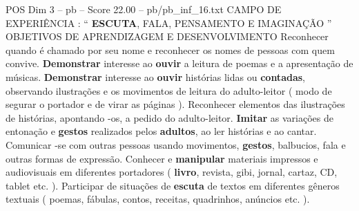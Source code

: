 \begin{textsample}{POS Dim 3 – pb – Score 22.00 – pb/pb\_inf\_16.txt}  \label{ex:f3_pos_086}
CAMPO DE EXPERIÊNCIA : “ \textbf{ESCUTA}, FALA, PENSAMENTO E IMAGINAÇÃO ” OBJETIVOS DE APRENDIZAGEM E DESENVOLVIMENTO Reconhecer quando é chamado por seu nome e reconhecer os nomes de pessoas com quem convive. \textbf{Demonstrar} interesse ao \textbf{ouvir} a leitura de poemas e a apresentação de músicas. \textbf{Demonstrar} interesse ao \textbf{ouvir} histórias lidas ou \textbf{contadas}, observando ilustrações e os movimentos de leitura do adulto-leitor ( modo de segurar o portador e de virar as páginas ).
Reconhecer elementos das ilustrações de histórias, apontando -os, a pedido do adulto-leitor. \textbf{Imitar} as variações de entonação e \textbf{gestos} realizados pelos \textbf{adultos}, ao ler histórias e ao cantar.
Comunicar -se com outras pessoas usando movimentos, \textbf{gestos}, balbucios, fala e outras formas de expressão.
Conhecer e \textbf{manipular} materiais impressos e audiovisuais em diferentes portadores ( \textbf{livro}, revista, gibi, jornal, cartaz, CD, tablet etc. ).
Participar de situações de \textbf{escuta} de textos em diferentes gêneros textuais ( poemas, fábulas, contos, receitas, quadrinhos, anúncios etc. ).

\end{textsample}
